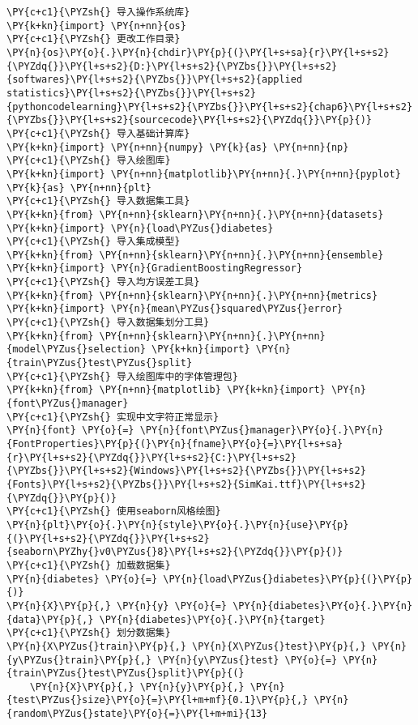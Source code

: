 \begin{Verbatim}[commandchars=\\\{\}]
\PY{c+c1}{\PYZsh{} 导入操作系统库}
\PY{k+kn}{import} \PY{n+nn}{os}
\PY{c+c1}{\PYZsh{} 更改工作目录}
\PY{n}{os}\PY{o}{.}\PY{n}{chdir}\PY{p}{(}\PY{l+s+sa}{r}\PY{l+s+s2}{\PYZdq{}}\PY{l+s+s2}{D:}\PY{l+s+s2}{\PYZbs{}}\PY{l+s+s2}{softwares}\PY{l+s+s2}{\PYZbs{}}\PY{l+s+s2}{applied statistics}\PY{l+s+s2}{\PYZbs{}}\PY{l+s+s2}{pythoncodelearning}\PY{l+s+s2}{\PYZbs{}}\PY{l+s+s2}{chap6}\PY{l+s+s2}{\PYZbs{}}\PY{l+s+s2}{sourcecode}\PY{l+s+s2}{\PYZdq{}}\PY{p}{)}
\PY{c+c1}{\PYZsh{} 导入基础计算库}
\PY{k+kn}{import} \PY{n+nn}{numpy} \PY{k}{as} \PY{n+nn}{np}
\PY{c+c1}{\PYZsh{} 导入绘图库}
\PY{k+kn}{import} \PY{n+nn}{matplotlib}\PY{n+nn}{.}\PY{n+nn}{pyplot} \PY{k}{as} \PY{n+nn}{plt}
\PY{c+c1}{\PYZsh{} 导入数据集工具}
\PY{k+kn}{from} \PY{n+nn}{sklearn}\PY{n+nn}{.}\PY{n+nn}{datasets} \PY{k+kn}{import} \PY{n}{load\PYZus{}diabetes}
\PY{c+c1}{\PYZsh{} 导入集成模型}
\PY{k+kn}{from} \PY{n+nn}{sklearn}\PY{n+nn}{.}\PY{n+nn}{ensemble} \PY{k+kn}{import} \PY{n}{GradientBoostingRegressor}
\PY{c+c1}{\PYZsh{} 导入均方误差工具}
\PY{k+kn}{from} \PY{n+nn}{sklearn}\PY{n+nn}{.}\PY{n+nn}{metrics} \PY{k+kn}{import} \PY{n}{mean\PYZus{}squared\PYZus{}error}
\PY{c+c1}{\PYZsh{} 导入数据集划分工具}
\PY{k+kn}{from} \PY{n+nn}{sklearn}\PY{n+nn}{.}\PY{n+nn}{model\PYZus{}selection} \PY{k+kn}{import} \PY{n}{train\PYZus{}test\PYZus{}split}
\PY{c+c1}{\PYZsh{} 导入绘图库中的字体管理包}
\PY{k+kn}{from} \PY{n+nn}{matplotlib} \PY{k+kn}{import} \PY{n}{font\PYZus{}manager}
\PY{c+c1}{\PYZsh{} 实现中文字符正常显示}
\PY{n}{font} \PY{o}{=} \PY{n}{font\PYZus{}manager}\PY{o}{.}\PY{n}{FontProperties}\PY{p}{(}\PY{n}{fname}\PY{o}{=}\PY{l+s+sa}{r}\PY{l+s+s2}{\PYZdq{}}\PY{l+s+s2}{C:}\PY{l+s+s2}{\PYZbs{}}\PY{l+s+s2}{Windows}\PY{l+s+s2}{\PYZbs{}}\PY{l+s+s2}{Fonts}\PY{l+s+s2}{\PYZbs{}}\PY{l+s+s2}{SimKai.ttf}\PY{l+s+s2}{\PYZdq{}}\PY{p}{)}
\PY{c+c1}{\PYZsh{} 使用seaborn风格绘图}
\PY{n}{plt}\PY{o}{.}\PY{n}{style}\PY{o}{.}\PY{n}{use}\PY{p}{(}\PY{l+s+s2}{\PYZdq{}}\PY{l+s+s2}{seaborn\PYZhy{}v0\PYZus{}8}\PY{l+s+s2}{\PYZdq{}}\PY{p}{)}
\PY{c+c1}{\PYZsh{} 加载数据集}
\PY{n}{diabetes} \PY{o}{=} \PY{n}{load\PYZus{}diabetes}\PY{p}{(}\PY{p}{)}
\PY{n}{X}\PY{p}{,} \PY{n}{y} \PY{o}{=} \PY{n}{diabetes}\PY{o}{.}\PY{n}{data}\PY{p}{,} \PY{n}{diabetes}\PY{o}{.}\PY{n}{target}
\PY{c+c1}{\PYZsh{} 划分数据集}
\PY{n}{X\PYZus{}train}\PY{p}{,} \PY{n}{X\PYZus{}test}\PY{p}{,} \PY{n}{y\PYZus{}train}\PY{p}{,} \PY{n}{y\PYZus{}test} \PY{o}{=} \PY{n}{train\PYZus{}test\PYZus{}split}\PY{p}{(}
    \PY{n}{X}\PY{p}{,} \PY{n}{y}\PY{p}{,} \PY{n}{test\PYZus{}size}\PY{o}{=}\PY{l+m+mf}{0.1}\PY{p}{,} \PY{n}{random\PYZus{}state}\PY{o}{=}\PY{l+m+mi}{13}

\end{Verbatim}
